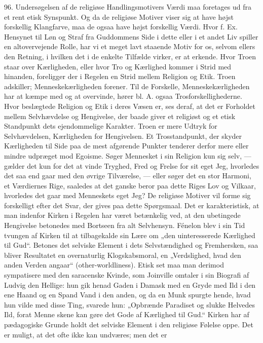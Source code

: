 \documentclass[12pt,a4paper,openany]{book}
\newcommand{\opage}[1]{\marginnote{\footnotesize\textit{[#1]}}}
\begin{document}
96. Undersøgelsen af de religiøse Handlingsmotivers Værdi maa foretages
ud fra et rent etisk Synspunkt. Og da de religiøse Motiver viser sig at
have højst forskellig Klangfarve, maa de ogsaa have højst forskellig
Værdi. Hvor f. Ex. Hensynet til Løn og Straf fra Guddommens Side i dette
eller i et andet Liv spiller en altovervejende Rolle, har vi et meget
lavt staaende Motiv for os, selvom ellers den Retning, i hvilken det i
de enkelte Tilfælde virker, er at erkende. Hvor Troen staar over
Kærligheden, eller hvor Tro og Kærlighed kommer i Strid med hinanden,
foreligger der i Regelen en Strid mellem Religion og Etik. Troen
adskiller; Menneskekærligheden forener. Til de Forskelle,
Menneskekærligheden har at kæmpe med og at overvinde, hører bl. A. ogsaa
Trosforskellighederne. Hvor beslægtede Religion og Etik i deres Væsen
er, ses deraf, at det er Forholdet mellem Selvhævdelse og Hengivelse,
der baade giver et religiøst og et etisk Standpunkt dets ejendommelige
Karakter. Troen er mere Udtryk for Selvhævdelsen, Kærligheden for
Hengivelsen. Et Trosstandpunkt, der skyder Kærligheden til Side paa de
mest afgørende Punkter tenderer derfor mere eller mindre udpræget mod
Egoisme. Søger Mennesket i sin Religion kun sig selv, --- gælder det kun
for det at vinde Tryghed, Fred og Frelse for sit eget Jeg, hvorledes det
saa end gaar med den øvrige Tilværelse, --- eller søger det en stor
Harmoni, et Værdiernes Rige, saaledes at det ganske beror paa dette
Riges Lov og Vilkaar, hvorledes det gaar med Menneskets eget Jeg? De
religiøse Motiver vil forme sig forskelligt efter det Svar, der gives
paa dette Spørgsmaal. Det er karakteristisk, at man indenfor Kirken i
Regelen har været betænkelig ved, at den ubetingede Hengivelse betonedes
med Bortseen fra alt Selvhensyn. Fénelon blev i sin Tid tvungen af
Kirken til at tilbagekalde sin Lære om „den uinteresserede Kærlighed til
Gud“. Betones det selviske Element i dets Selvstændighed og Fremhersken,
saa bliver Resultatet en overnaturlig Klogskabsmoral, en „Verdslighed,
hvad den anden Verden angaar“ (other-worldliness). Etisk set maa man
derimod sympatisere med den saracenske Kvinde, som Joinville omtaler i
sin Biografi af Ludvig den Hellige: hun gik henad Gaden i Damask med en
Gryde med Ild i den ene Haand og en Spand Vand i den anden, og da en
Munk spurgte hende, hvad hun vilde med disse Ting, svarede hun:
„Opbrænde Paradiset og slukke Helvedes Ild, forat Menne%
\opage{220}skene kan gøre det Gode af Kærlighed til Gud.“ Kirken har af
pædagogiske Grunde holdt det selviske Element i den religiøse Følelse
oppe. Det er muligt, at det ofte ikke kan undværes; men det er
\end{document}
